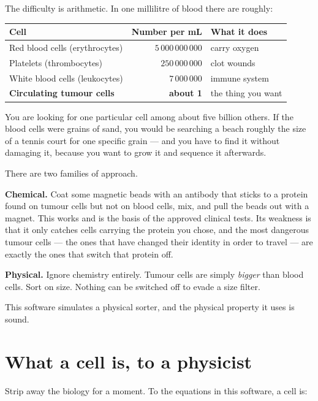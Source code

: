 \documentclass[11pt,a4paper]{article}
\begin{document}
The difficulty is arithmetic. In one millilitre of blood there are roughly:

\begin{center}
\small
\begin{tabular}{lrl}
\toprule
\textbf{Cell} & \textbf{Number per mL} & \textbf{What it does} \\
\midrule
Red blood cells (erythrocytes) & $5\,000\,000\,000$ & carry oxygen \\
Platelets (thrombocytes)       & $250\,000\,000$    & clot wounds \\
White blood cells (leukocytes) & $7\,000\,000$      & immune system \\
\textbf{Circulating tumour cells} & \textbf{about 1} & the thing you want \\
\bottomrule
\end{tabular}
\end{center}

\begin{plain}
You are looking for one particular cell among about five billion others. If
the blood cells were grains of sand, you would be searching a beach roughly the
size of a tennis court for one specific grain --- and you have to find it
without damaging it, because you want to grow it and sequence it afterwards.
\end{plain}

There are two families of approach.

\textbf{Chemical.} Coat some magnetic beads with an antibody that sticks to a
protein found on tumour cells but not on blood cells, mix, and pull the beads
out with a magnet. This works and is the basis of the approved clinical tests.
Its weakness is that it only catches cells carrying the protein you chose, and
the most dangerous tumour cells --- the ones that have changed their identity in
order to travel --- are exactly the ones that switch that protein off.

\textbf{Physical.} Ignore chemistry entirely. Tumour cells are simply
\emph{bigger} than blood cells. Sort on size. Nothing can be switched off to
evade a size filter.

This software simulates a physical sorter, and the physical property it uses is
sound.

\section{What a cell is, to a physicist}

Strip away the biology for a moment. To the equations in this software, a cell
is:
\end{document}
